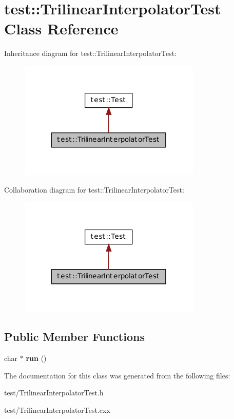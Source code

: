 \hypertarget{classtest_1_1_trilinear_interpolator_test}{
\section{test::TrilinearInterpolatorTest Class Reference}
\label{classtest_1_1_trilinear_interpolator_test}
}


Inheritance diagram for test::TrilinearInterpolatorTest:\nopagebreak
\begin{figure}[H]
\begin{center}
\leavevmode
\includegraphics[width=246pt]{classtest_1_1_trilinear_interpolator_test__inherit__graph}
\end{center}
\end{figure}


Collaboration diagram for test::TrilinearInterpolatorTest:\nopagebreak
\begin{figure}[H]
\begin{center}
\leavevmode
\includegraphics[width=246pt]{classtest_1_1_trilinear_interpolator_test__coll__graph}
\end{center}
\end{figure}
\subsection*{Public Member Functions}
\begin{DoxyCompactItemize}
\item 
\hypertarget{classtest_1_1_trilinear_interpolator_test_a9ac22b32ae96abbeaec857e61626012b}{
char $\ast$ {\bfseries run} ()}
\label{classtest_1_1_trilinear_interpolator_test_a9ac22b32ae96abbeaec857e61626012b}

\end{DoxyCompactItemize}


The documentation for this class was generated from the following files:\begin{DoxyCompactItemize}
\item 
test/TrilinearInterpolatorTest.h\item 
test/TrilinearInterpolatorTest.cxx\end{DoxyCompactItemize}
